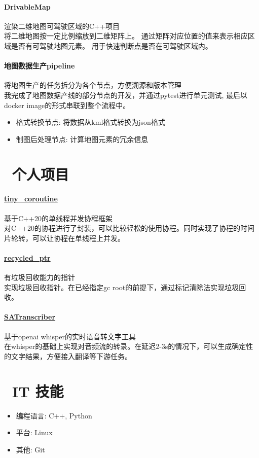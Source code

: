 \documentclass{resume}
\begin{document}
        \paragraph{DrivableMap} 渲染二维地图可驾驶区域的C++项目\\
            将二维地图按一定比例缩放到二维矩阵上。
            通过矩阵对应位置的值来表示相应区域是否有可驾驶地图元素。
            用于快速判断点是否在可驾驶区域内。

        \paragraph{地图数据生产pipeline} 将地图生产的任务拆分为各个节点，方便溯源和版本管理\\
            我完成了地图数据产线的部分节点的开发，并通过pytest进行单元测试, 最后以docker image的形式串联到整个流程中。
            \begin{itemize}
                \item 格式转换节点: 将数据从kml格式转换为json格式
                \item 制图后处理节点: 计算地图元素的冗余信息
            \end{itemize}

    \section{\faBook\ 个人项目}
        \paragraph{ \href{https://github.com/ya-hong/tiny_coroutine}{tiny\_coroutine}} 基于C++20的单线程并发协程框架\\
            对C++20的协程进行了封装，可以比较轻松的使用协程。同时实现了协程的时间片轮转，可以让协程在单线程上并发。
            
        \paragraph{ \href{https://github.com/ya-hong/recycled_ptr}{recycled\_ptr} } 有垃圾回收能力的指针\\
            实现垃圾回收指针。在已经指定gc root的前提下，通过标记清除法实现垃圾回收。

        \paragraph{ \href{https://github.com/ya-hong/SATranscriber}{SATranscriber} } 基于openai whisper的实时语音转文字工具\\
            在whisper的基础上实现对音频流的转录。在延迟2-3s的情况下，可以生成确定性的文字结果，方便接入翻译等下游任务。
    
    \section{\faCogs\ IT 技能}
    \begin{itemize}
      \item 编程语言: C++, Python
      \item 平台: Linux
      \item 其他: Git
    \end{itemize}
\end{document}
